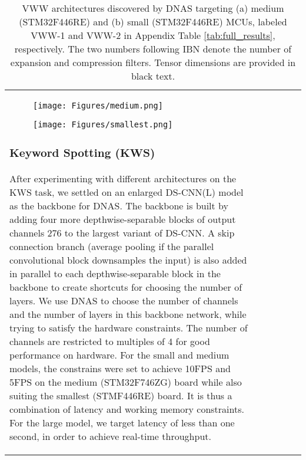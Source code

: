 \documentclass{article}
\begin{document}
\begin{table}[t]
\begin{tabular}{l| c | c | c | c | c}
\begin{figure*}
    \begin{subfigure}[b]{\textwidth}
         \centering
        \texttt{[image: Figures/medium.png]}    
        \caption{}
         \label{fig:vww medium}
     \end{subfigure}
     
     \hfill
    \vspace{-10pt}
    
     \begin{subfigure}[b]{\textwidth}
         \centering
        \texttt{[image: Figures/smallest.png]}   
        \caption{}
\label{fig:vww smallest}
     \end{subfigure}
     
     \vspace{-10pt}
     \caption{VWW architectures discovered by DNAS targeting (a) medium (STM32F446RE)  and (b) small (STM32F446RE) MCUs, labeled VWW-1 and VWW-2 in Appendix Table \ref{tab:full_results}, respectively. 
     The two numbers following IBN denote the number of expansion and compression filters.
     Tensor dimensions are provided in black text.
     }
    \label{fig:vww-archs}
\end{figure*}



\subsubsection{Keyword Spotting (KWS)}
After experimenting with different architectures on the KWS task, we settled on an enlarged DS-CNN(L) \cite{helloedge} model as the backbone for DNAS.
The backbone is built by adding four more depthwise-separable blocks of output channels 276 to the largest variant of DS-CNN. A skip connection branch (average pooling if the parallel convolutional block downsamples the input) is also added in parallel to each depthwise-separable block in the backbone to create shortcuts for choosing the number of layers. We use DNAS to choose the number of channels and the number of layers in this backbone network, while trying to satisfy the hardware constraints. 
The number of channels are restricted to multiples of 4 for good performance on hardware. 
For the small and medium models, the constrains were set to achieve 10FPS and 5FPS on the medium (STM32F746ZG) board while also suiting the smallest (STMF446RE) board. It is thus a combination of latency and working memory constraints. For the large model, we target latency of less than one second, in order to achieve real-time throughput.



\end{tabular}
\end{table}
\end{document}
